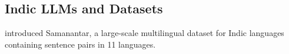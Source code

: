 

\subsection{Indic LLMs and Datasets}

\citet{ramesh2022samanantar} introduced Samanantar, a large-scale multilingual
dataset for Indic languages containing sentence pairs in 11 languages. 
